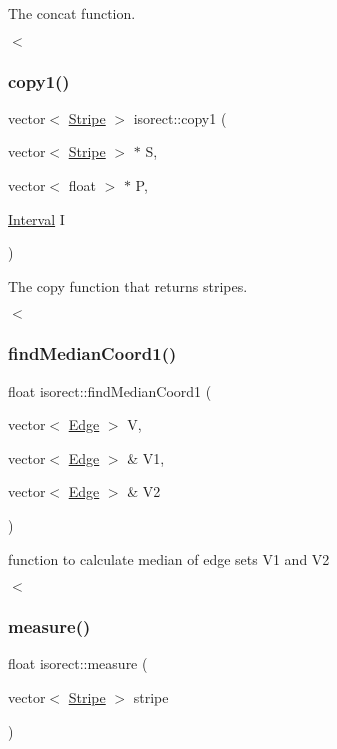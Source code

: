 The concat function. 

$<$ \mbox{\label{classisorect_aa9e8b006294ee85a378fbc061f1c4f2f}} 
\subsubsection{\texorpdfstring{copy1()}{copy1()}}
{\footnotesize\ttfamily vector$<$ \hyperlink{classStripe}{Stripe} $>$ isorect\+::copy1 (\begin{DoxyParamCaption}\item[{vector$<$ \hyperlink{classStripe}{Stripe} $>$ $\ast$}]{S,  }\item[{vector$<$ float $>$ $\ast$}]{P,  }\item[{\hyperlink{classInterval}{Interval}}]{I }\end{DoxyParamCaption})}



The copy function that returns stripes. 

$<$ \mbox{\label{classisorect_a82bd808dcca448ce35645d2af0e13596}} 
\subsubsection{\texorpdfstring{find\+Median\+Coord1()}{findMedianCoord1()}}
{\footnotesize\ttfamily float isorect\+::find\+Median\+Coord1 (\begin{DoxyParamCaption}\item[{vector$<$ \hyperlink{classEdge}{Edge} $>$}]{V,  }\item[{vector$<$ \hyperlink{classEdge}{Edge} $>$ \&}]{V1,  }\item[{vector$<$ \hyperlink{classEdge}{Edge} $>$ \&}]{V2 }\end{DoxyParamCaption})}



function to calculate median of edge sets V1 and V2 

$<$ \mbox{\label{classisorect_ae2478502a1adbae4ff7a95c889860b70}} 
\subsubsection{\texorpdfstring{measure()}{measure()}}
{\footnotesize\ttfamily float isorect\+::measure (\begin{DoxyParamCaption}\item[{vector$<$ \hyperlink{classStripe}{Stripe} $>$}]{stripe }\end{DoxyParamCaption})}



